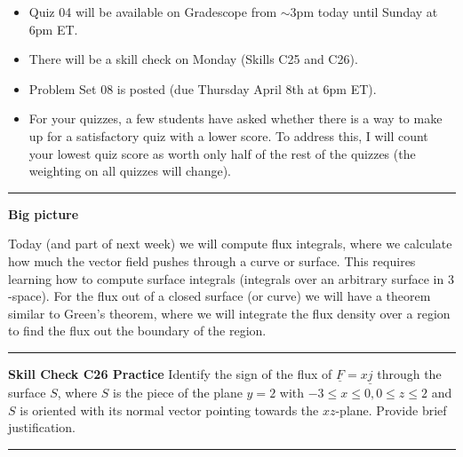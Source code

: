 \documentclass[12pt,letterpaper,noanswers]{exam}
\newcommand{\mb}[1]{\underline{#1}}
\begin{document}
 \pdfpageheight 11in 
  \pdfpagewidth 8.5in





\begin{itemize}
\itemsep0em
\item Quiz 04 will be available on Gradescope from $\sim$3pm today until Sunday at 6pm ET.
\item There will be a skill check on Monday (Skills C25 and C26).
\item Problem Set 08 is posted (due Thursday April 8th at 6pm ET).
\item For your quizzes, a few students have asked whether there is a way to make up for a satisfactory quiz with a lower score.  To address this, I will count your lowest quiz score as worth only half of the rest of the quizzes (the weighting on all quizzes will change).
\end{itemize}

\hrule
\vspace{0.2cm}


\noindent\textbf{Big picture}

Today (and part of next week) we will compute flux integrals, where we calculate how much the vector field pushes through a curve or surface.  This requires learning how to compute surface integrals (integrals over an arbitrary surface in $3$-space).  For the flux out of a closed surface (or curve) we will have a theorem similar to Green's theorem, where we will integrate the flux density over a region to find the flux out the boundary of the region.

\vspace{0.2cm}
\hrule
\vspace{0.2cm}

\noindent\textbf{Skill Check C26 Practice}
Identify the sign of the flux of $\mb F = x\mb j$ through the surface $S$, where $S$ is the piece of the plane $y = 2$ with $-3\leq x \leq 0, 0\leq z\leq 2$ and $S$ is oriented with its normal vector pointing towards the $xz$-plane.  Provide brief justification.
\vspace{0.2cm}
\hrule
\vspace{0.2cm}
\end{document}
